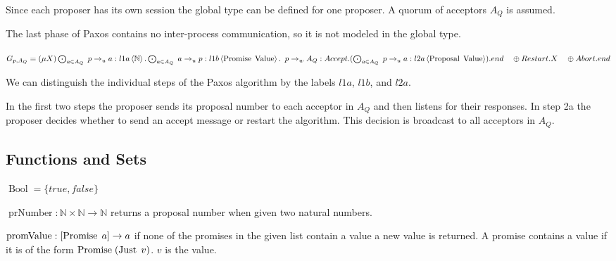 Since each proposer has its own session the global type can be defined for one proposer.
A quorum of acceptors $A_Q$ is assumed.

The last phase of Paxos contains no inter-process communication, so it is not modeled in the global type.

$G_{p, A_Q} = (\mu X) \bigodot_{a \in A_Q}\; p \to_u a : l1a \left\langle \mathbb{N} \right\rangle . \bigodot_{a \in A_Q}\; a \to_u p : l1b \left\langle \operatorname{Promise}\; \operatorname{Value} \right\rangle .\\
\hspace*{0.5em}p \to_w A_Q : \mathnormal{Accept}.(\bigodot_{a \in A_Q}\; p \to_u a : l2a \left\langle \operatorname{Proposal}\; \operatorname{Value} \right\rangle).end\\
\hspace*{1em}\oplus \mathnormal{Restart}.X\\
\hspace*{1em}\oplus \mathnormal{Abort}.end$

We can distinguish the individual steps of the Paxos algorithm by the labels $l1a$, $l1b$, and $l2a$.

In the first two steps the proposer sends its proposal number to each acceptor in $A_Q$ and then listens for their responses.
In step 2a the proposer decides whether to send an accept message or restart the algorithm.
This decision is broadcast to all acceptors in $A_Q$.

\subsection{Functions and Sets}
\newcommand{\Bool}[0]{\operatorname{Bool}}
\newcommand{\prNumber}[2]{\operatorname{prNumber}\left( #1, #2 \right)}
\newcommand{\promValue}[1]{\operatorname{promValue}\left(#1\right)}
\newcommand{\anyNack}[1]{\operatorname{anyNack}\left(#1\right)}
\newcommand{\promCount}[1]{\operatorname{promCount}\left(#1\right)}
\newcommand{\greaterThan}[2]{\operatorname{gt}\left(#1, #2\right)}
\newcommand{\greaterEqual}[2]{\operatorname{ge}\left(#1, #2\right)}
\newcommand{\nFromPr}[1]{\operatorname{nFromPr}\left(#1 \right)}
\newcommand{\genAq}[3]{\operatorname{genA_Q}\left(#1, #2, #3\right)}

$\Bool = \{ true, false \}$

$\operatorname{prNumber} : \mathbb{N} \times \mathbb{N} \to \mathbb{N}$ returns a proposal number when given two natural numbers.

$\operatorname{promValue} : [\operatorname{Promise}\; a] \to a$ if none of the promises in the given list contain a value a new value is returned.
A promise contains a value if it is of the form $\operatorname{Promise}\; (\operatorname{Just}\; v)$.
$v$ is the value.

